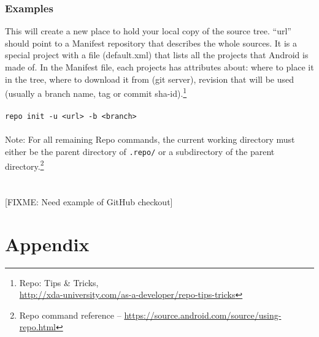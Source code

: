 \documentclass[12pt,letterpaper,dvips]{article}
\newcommand{\FIXME}[1]{\textsf{[FIXME: #1]}}
\newcommand{\cmd}[1]{\texttt{#1}}
\begin{document}
\subsubsection{Examples}
This will create a new place to hold your local copy of the source
tree.   ``url'' should point to a Manifest repository that
describes the whole sources.  It is a special project with a file
(default.xml) that lists all the projects that Android is made of.
In the Manifest file, each projects has attributes about: where to
place it in the tree, where to download it from (git server),
revision that will be used (usually a branch name, tag or commit
sha-id).\footnote{Repo: Tips \& Tricks,\\
\href{http://xda-university.com/as-a-developer/repo-tips-tricks}{http://xda-university.com/as-a-developer/repo-tips-tricks}}
\\
\\
\indent\cmd{repo init -u <url> -b <branch>}
\\
\\
\noindent Note: For all remaining Repo commands, the current working
directory must either be the parent directory of \cmd{.repo/}
or a subdirectory of the parent directory.\footnote{Repo command reference --
\href{https://source.android.com/source/using-repo.html\#forall}{https://source.android.com/source/using-repo.html}}\\
\\
\\
\noindent \FIXME{Need example of GitHub checkout}


\newpage
\setcounter{secnumdepth}{0}
\section{Appendix}
\end{document}
